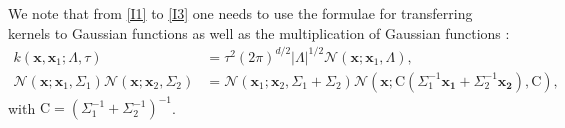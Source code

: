 \documentclass[11pt]{article}
\begin{document}
We note that from \eqref{I1} to \eqref{I3} one needs to use the formulae for transferring kernels to Gaussian functions as well as the multiplication of Gaussian functions \cite{rasmussen2003gaussian}:
\begin{align}
    k(\mathbf{x}, \mathbf{x}_1;\Lambda, \tau) & = \tau^2 (2\pi)^{d/2} |\Lambda|^{1/2} \mathcal{N}(\mathbf{x};\mathbf{x}_1, \Lambda), 
\label{kk} \\ 
    \mathcal{N}(\mathbf{x}; \mathbf{x}_1, \Sigma_1) \mathcal{N}(\mathbf{x}; \mathbf{x}_2, \Sigma_2) & = \mathcal{N}(\mathbf{x}_1; \mathbf{x}_2, \Sigma_1 + \Sigma_2) 
    \mathcal{N}(\mathbf{x}; \mathrm{C}(\Sigma_1^{-1}\mathbf{x_1}+\Sigma_2^{-1}\mathbf{x_2}), \mathrm{C}),
\label{kN} 
\end{align}
with $\mathrm{C} = (\Sigma_1^{-1} + \Sigma_2^{-1})^{-1}$.
\end{document}
